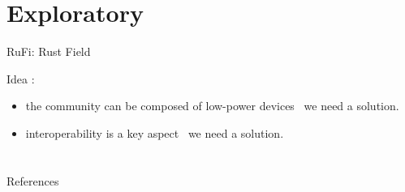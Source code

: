 \documentclass[presentation, 9pt, aspectratio=169]{beamer}\mode<presentation>{\usetheme{AMSBolognaFC}}
\begin{document}
\section{Exploratory}
\begin{frame}{RuFi: Rust Field}
\begin{alertblock}{Idea}
	: \begin{itemize}
		\item the community can be composed of low-power devices \faArrowRight \, we need a  solution.
		\item interoperability is a key aspect \faArrowRight \, we need a  solution.
	\end{itemize}
\end{alertblock}
\end{frame}
\section{}


\frame{\titlepage}

\section*{\refname}



\begin{frame}[allowframebreaks]{References}
\def\bibfont{\footnotesize}
\printbibliography
\end{frame}

\end{document}

